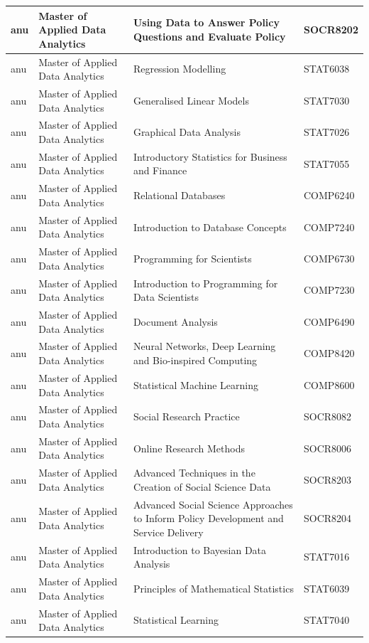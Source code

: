 \documentclass[
  letterpaper,
  DIV=11,
  numbers=noendperiod]{scrreport}
\begin{document}
\begin{table}
\begin{tabular}{l|l|l|l}
\hline
anu & Master of Applied Data Analytics & Using Data to Answer Policy Questions and Evaluate Policy & SOCR8202\\
\hline
anu & Master of Applied Data Analytics & Regression Modelling & STAT6038\\
\hline
anu & Master of Applied Data Analytics & Generalised Linear Models & STAT7030\\
\hline
anu & Master of Applied Data Analytics & Graphical Data Analysis & STAT7026\\
\hline
anu & Master of Applied Data Analytics & Introductory Statistics for Business and Finance & STAT7055\\
\hline
anu & Master of Applied Data Analytics & Relational Databases & COMP6240\\
\hline
anu & Master of Applied Data Analytics & Introduction to Database Concepts & COMP7240\\
\hline
anu & Master of Applied Data Analytics & Programming for Scientists & COMP6730\\
\hline
anu & Master of Applied Data Analytics & Introduction to Programming for Data Scientists & COMP7230\\
\hline
anu & Master of Applied Data Analytics & Document Analysis & COMP6490\\
\hline
anu & Master of Applied Data Analytics & Neural Networks, Deep Learning and Bio-inspired Computing & COMP8420\\
\hline
anu & Master of Applied Data Analytics & Statistical Machine Learning & COMP8600\\
\hline
anu & Master of Applied Data Analytics & Social Research Practice & SOCR8082\\
\hline
anu & Master of Applied Data Analytics & Online Research Methods & SOCR8006\\
\hline
anu & Master of Applied Data Analytics & Advanced Techniques in the Creation of Social Science Data & SOCR8203\\
\hline
anu & Master of Applied Data Analytics & Advanced Social Science Approaches to Inform Policy Development and Service Delivery & SOCR8204\\
\hline
anu & Master of Applied Data Analytics & Introduction to Bayesian Data Analysis & STAT7016\\
\hline
anu & Master of Applied Data Analytics & Principles of Mathematical Statistics & STAT6039\\
\hline
anu & Master of Applied Data Analytics & Statistical Learning & STAT7040\\

\end{tabular}
\end{table}
\end{document}
